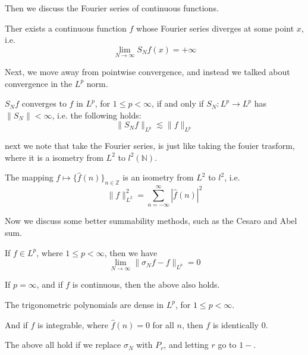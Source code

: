 \documentclass[lang=en,10pt, color=none]{elegantbook}
\newcommand{\Z}{\mathbb{Z}}
\newcommand{\N}{\mathbb{N}}
\begin{document}
Then we discuss the Fourier series of continuous functions.
\begin{theorem}
    Ther exists a continuous function $f$ whose Fourier series diverges at some point $x$, i.e.
    \begin{equation*}
        \lim_{N\to\infty}S_Nf(x)=+\infty
    \end{equation*}
\end{theorem}
\begin{comment}
    We showed this using uniform boundedness principle.
\end{comment}

Next, we move away from pointwise convergence, and instead we talked about convergence in the $L^p$ norm.
\begin{lemma}
    $S_Nf$ converges to $f$ in $L^p$, for $1\leq p<\infty$, if and only if $S_N: L^p\to L^p$ has $\|S_N\|<\infty$, i.e. the following holds:
    \begin{equation*}
        \|S_Nf\|_{L^p}\lesssim \|f\|_{L^p}
    \end{equation*}
\end{lemma}

next we note that take the Fourier series, is just like taking the fouier trasform, where it is a isometry from $L^2$ to $l^2(\N)$.
\begin{theorem}
    The mapping $f\mapsto \{\hat{f}(n)\}_{n\in\Z}$ is an isometry from $L^2$ to $l^2$, i.e.
    \begin{equation*}
        \|f\|_{L^2}^2=\sum_{n=-\infty}^\infty |\hat{f}(n)|^2
    \end{equation*}
\end{theorem}

Now we discuss some better summability methods, such as the Cesaro and Abel sum.
\begin{theorem}
    If $f\in L^p$, where $1\leq p<\infty$, then we have
    \begin{equation*}
        \lim_{N\to\infty}\|\sigma_Nf-f\|_{L^p}=0
    \end{equation*}

    If $p=\infty$, and if $f$ is continuous, then the above also holds.
\end{theorem}

\begin{corollary}
    The trigonometric polynomials are dense in $L^p$, for $1\leq p<\infty$.

    And if $f$ is integrable, where $\hat{f}(n)=0$ for all $n$, then $f$ is identically 0.
\end{corollary}
\begin{comment}
    The first one is by $\sigma_N(f)$ being a trig polynomials. And the second one is by Cesaro sum of Fourier series of $L^1$ functions would be 0, then $\int |f|=0$.
\end{comment}
\begin{note}
    The above all hold if we replace $\sigma_N$ with $P_r$, and letting $r$ go to $1-$.
\end{note}
\end{document}
